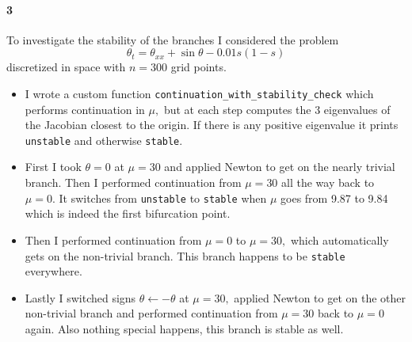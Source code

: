\documentclass[a4paper]{article}
\begin{document}
  \paragraph{3} To investigate the stability of the branches I considered the problem $$\theta_t = \theta_{xx} + \sin \theta - 0.01 s(1-s)$$ discretized in space with $n = 300$ grid points.
  \begin{itemize}
    \item I wrote a custom function {\tt continuation\_with\_stability\_check} which performs continuation in $\mu,$ but at each step computes the 3 eigenvalues of the Jacobian closest to the origin. If there is any positive eigenvalue it prints {\tt unstable} and otherwise {\tt stable}.
    \item First I took $\theta = 0$ at $\mu = 30$ and applied Newton to get on the nearly trivial branch. Then I performed continuation from $\mu = 30$ all the way back to $\mu = 0.$ It switches from {\tt unstable} to {\tt stable} when $\mu$ goes from 9.87 to 9.84 which is indeed the first bifurcation point.
    \item Then I performed continuation from $\mu = 0$ to $\mu = 30,$ which automatically gets on the non-trivial branch. This branch happens to be {\tt stable} everywhere.
    \item Lastly I switched signs $\theta \gets -\theta$ at $\mu = 30,$ applied Newton to get on the other non-trivial branch and performed continuation from $\mu = 30$ back to $\mu = 0$ again. Also nothing special happens, this branch is stable as well.

  \end{itemize}
\end{document}
